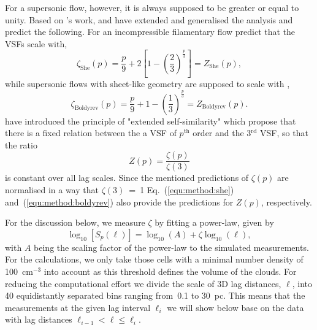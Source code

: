 For a supersonic flow, however, it is always supposed to be greater or equal to unity.
Based on \citeauthor{Kolmogorov1941}'s work, \citet{She1994} and \citet{Boldyrev2002} have extended and generalised the analysis and predict the following.
For an incompressible filamentary flow \citet{She1994} predict that the VSFs scale with,
\begin{equation}
	\zeta_\mathrm{She}(p) = \frac{p}{9} + 2 \left[ 1 - \left( \frac{2}{3} \right)^{\frac{p}{3}} \right] = Z_\mathrm{She}(p) ,
    \label{equ:method:she}
\end{equation}
while supersonic flows with sheet-like geometry are supposed to scale with \citep{Boldyrev2002},
\begin{equation}
	 \zeta_\mathrm{Boldyrev}(p) = \frac{p}{9} + 1 - \left( \frac{1}{3} \right)^{\frac{p}{3}} = Z_\mathrm{Boldyrev}(p) .
    \label{equ:method:boldyrev}
\end{equation}
\citet{Benzi1993} have introduced the principle of "extended self-similarity" which propose that there is a fixed relation between the a VSF of $p^\mathrm{th}$ order and the 3$^\mathrm{rd}$ VSF, so that the ratio 
\begin{equation}
	Z(p) = \frac{\zeta(p)}{\zeta(3)}
	\label{equ:method:z_def}
\end{equation} 
is constant over all lag scales.
Since the mentioned predictions of $\zeta(p)$ are normalised in a way that $\zeta(3)$~=~1 Eq.~(\ref{equ:method:she}) and~(\ref{equ:method:boldyrev}) also provide the predictions for $Z(p)$, respectively.

For the discussion below, we measure $\zeta$ by fitting a power-law, given by
\begin{equation}
	\log_{10}\left[ S_p(\ell) \right] = \log_{10}\left(A\right) + \zeta \log_{10}(\ell) ,
    \label{equ:method:fitting}
\end{equation}
with $A$ being the scaling factor of the power-law to the simulated measurements.
For the calculations, we only take those cells with a minimal number density of 100~cm$^{-3}$ into account as this threshold defines the volume of the clouds.
For reducing the computational effort we divide the scale of 3D lag distances, $\ell$, into 40 equidistantly separated bins ranging from~0.1 to 30~pc.
This means that the measurements at the given lag interval $\ell_i$ we will show below base on the data with lag distances $\ell_{i-1} < \ell \leq \ell_i$.


\endinput
